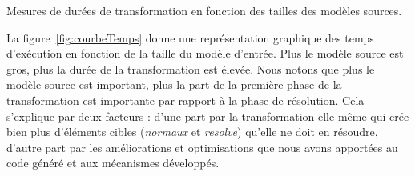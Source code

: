 
\begin{table}[h]
  \begin{center}
    
    \caption{Mesures de durées de transformation en fonction des tailles des
    modèles sources.}
    \label{table:tempsTomFull}
  \end{center}
\end{table}



La figure~\ref{fig:courbeTemps} donne une représentation graphique des temps
d'exécution en fonction de la taille du modèle d'entrée. Plus le modèle
source est gros, plus la durée de la transformation est élevée. Nous notons que
plus le modèle source est important, plus la part de la première phase de la
transformation est importante par rapport à la phase de résolution. Cela
s'explique par deux facteurs : d'une part par la transformation elle-même qui
crée bien plus d'éléments cibles (\emph{normaux} et \emph{resolve}) qu'elle ne
doit en résoudre, d'autre part par les améliorations et optimisations que nous
avons apportées au code généré et aux mécanismes développés.

